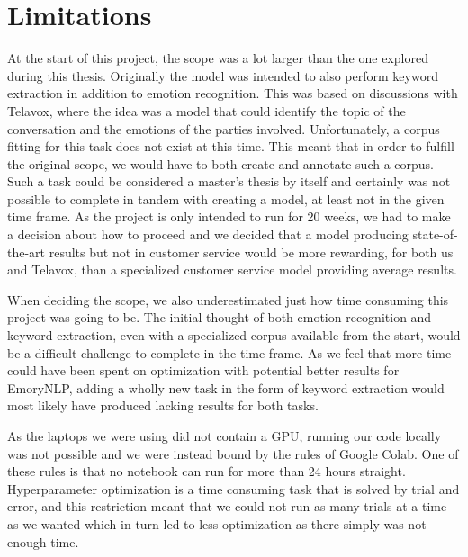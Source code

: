 \documentclass[nofilelist]{cslthse-msc}
\begin{document}
\section{Limitations}
\label{limitations}

At the start of this project, the scope was a lot larger than the one explored during this thesis. Originally the model was intended to also perform keyword extraction in addition to emotion recognition. This was based on discussions with Telavox, where the idea was a model that could identify the topic of the conversation and the emotions of the parties involved. Unfortunately, a corpus fitting for this task does not exist at this time. This meant that in order to fulfill the original scope, we would have to both create and annotate such a corpus. Such a task could be considered a master's thesis by itself and certainly was not possible to complete in tandem with creating a model, at least not in the given time frame. As the project is only intended to run for 20 weeks, we had to make a decision about how to proceed and we decided that a model producing state-of-the-art results but not in customer service would be more rewarding, for both us and Telavox, than a specialized customer service model providing average results. 

When deciding the scope, we also underestimated just how time consuming this project was going to be. The initial thought of both emotion recognition and keyword extraction, even with a specialized corpus available from the start, would be a difficult challenge to complete in the time frame. As we feel that more time could have been spent on optimization with potential better results for EmoryNLP, adding a wholly new task in the form of keyword extraction would most likely have produced lacking results for both tasks.

As the laptops we were using did not contain a GPU, running our code locally was not possible and we were instead bound by the rules of Google Colab. One of these rules is that no notebook can run for more than 24 hours straight. Hyperparameter optimization is a time consuming task that is solved by trial and error, and this restriction meant that we could not run as many trials at a time as we wanted which in turn led to less optimization as there simply was not enough time.


\end{document}
